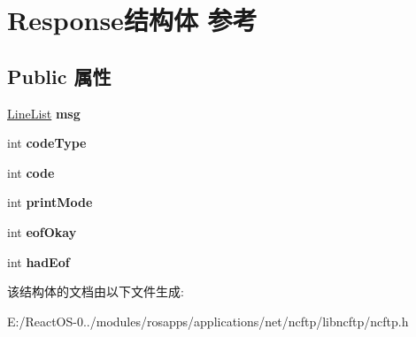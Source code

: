 \hypertarget{struct_response}{}\section{Response结构体 参考}
\label{struct_response}
\subsection*{Public 属性}
\begin{DoxyCompactItemize}
\item 
\mbox{\label{struct_response_ad3349f244dd9e924a1281bd63fe303ad}} 
\hyperlink{struct_line_list}{Line\+List} {\bfseries msg}
\item 
\mbox{\label{struct_response_acd6f4101effac7ccabde8abad5e01e79}} 
int {\bfseries code\+Type}
\item 
\mbox{\label{struct_response_ac5735ee80a09411fa59bd67bfd8ac6f5}} 
int {\bfseries code}
\item 
\mbox{\label{struct_response_a4f775027c77c217545a15141d45d626b}} 
int {\bfseries print\+Mode}
\item 
\mbox{\label{struct_response_a12c5b21a870bcb6221db1e88983c68e7}} 
int {\bfseries eof\+Okay}
\item 
\mbox{\label{struct_response_a1bd14c18a6093978d5c4fa63353061e5}} 
int {\bfseries had\+Eof}
\end{DoxyCompactItemize}


该结构体的文档由以下文件生成\+:\begin{DoxyCompactItemize}
\item 
E\+:/\+React\+O\+S-\/0../modules/rosapps/applications/net/ncftp/libncftp/ncftp.\+h\end{DoxyCompactItemize}

